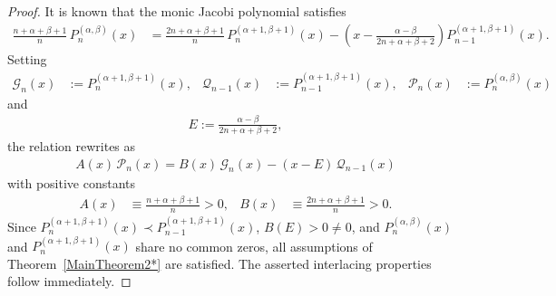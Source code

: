 \documentclass[final,3p,times,12pt]{elsarticle}
\numberwithin{equation}{section}  %
\begin{document}
\begin{proof}
	It is known \cite[eq.~(8)]{Driver-Jordaan-NumerAlg-2018} that the monic Jacobi polynomial satisfies
	\begin{align}\label{Mixed-TTRR-Monic-Jacobi-DJ-2018-eq8*}
		\frac{n+\alpha+\beta+1}{n}\,P^{(\alpha,\beta)}_n(x)
		&= \frac{2n+\alpha+\beta+1}{n}\,P^{(\alpha+1,\beta+1)}_n(x)
		 - \left(x - \frac{\alpha-\beta}{2n+\alpha+\beta+2}\right)P^{(\alpha+1,\beta+1)}_{n-1}(x).
	\end{align}
	Setting
	\begin{align*}
		\mathcal{G}_n(x) &:= P^{(\alpha+1,\beta+1)}_n(x), &
		\mathcal{Q}_{n-1}(x) &:= P^{(\alpha+1,\beta+1)}_{n-1}(x), &
		\mathcal{P}_n(x) &:= P^{(\alpha,\beta)}_n(x)
	\end{align*}
	and
	\begin{align*}
		E := \frac{\alpha-\beta}{2n+\alpha+\beta+2},
	\end{align*}
	the relation rewrites as
	\begin{align*}
		A(x)\,\mathcal{P}_n(x) = B(x)\,\mathcal{G}_n(x) - (x-E)\,\mathcal{Q}_{n-1}(x)
	\end{align*}
	with positive constants
	\begin{align*}
		A(x) &\equiv \frac{n+\alpha+\beta+1}{n}>0, &
		B(x) &\equiv \frac{2n+\alpha+\beta+1}{n}>0.
	\end{align*}
	Since $P^{(\alpha+1,\beta+1)}_n(x)\prec P^{(\alpha+1,\beta+1)}_{n-1}(x)$, $B(E)>0\neq0$, and $P^{(\alpha, \beta)}_n(x)$   and $P^{(\alpha+1, \beta+1)}_n(x)$  share no common zeros, all assumptions of Theorem~\ref{MainTheorem2*} are satisfied. The asserted interlacing properties follow immediately.
\end{proof}
\end{document}
